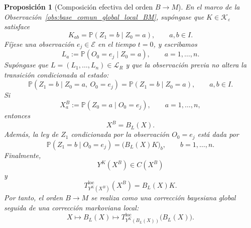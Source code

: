 \documentclass[12pt]{article}
\newtheorem{proposicion}{Proposición}[section]
\begin{document}
\begin{proposicion}[Composición efectiva del orden \(B\to M\)]
\label{prop:composicion_BM_kolmogorov}
En el marco de la Observación~\ref{obs:base_comun_global_local_BM}, supóngase que \(K\in\mathcal K_\varepsilon\) satisface
\[
K_{ab}
=
\mathbb P(Z_1=b\mid Z_0=a),
\qquad a,b\in I.
\]
Fíjese una observación \(e_j\in\mathcal E\) en el tiempo \(t=0\), y escribamos
\[
L_a
:=
\mathbb P(O_0=e_j\mid Z_0=a),
\qquad a=1,\dots,n.
\]
Supóngase que \(L=(L_1,\dots,L_n)\in\mathcal L_R\) y que la observación previa no altera la transición condicionada al estado:
\[
\mathbb P(Z_1=b\mid Z_0=a,\ O_0=e_j)
=
\mathbb P(Z_1=b\mid Z_0=a),
\qquad a,b\in I.
\]
Si
\[
X^B_a
:=
\mathbb P(Z_0=a\mid O_0=e_j),
\qquad a=1,\dots,n,
\]
entonces
\[
X^B=B_L(X).
\]
Además, la ley de \(Z_1\) condicionada por la observación \(O_0=e_j\) está dada por
\[
\mathbb P(Z_1=b\mid O_0=e_j)
=
\bigl(B_L(X)K\bigr)_b,
\qquad b=1,\dots,n.
\]
Finalmente,
\[
Y^K(X^B)\in C(X^B)
\]
y
\[
T^{\mathrm{loc}}_{Y^K(X^B)}(X^B)
=
B_L(X)K.
\]
Por tanto, el orden \(B\to M\) se realiza como una corrección bayesiana global seguida de una corrección markoviana local:
\[
X
\longmapsto
B_L(X)
\longmapsto
T^{\mathrm{loc}}_{Y^K(B_L(X))}
\bigl(B_L(X)\bigr).
\]
\end{proposicion}
\end{document}
